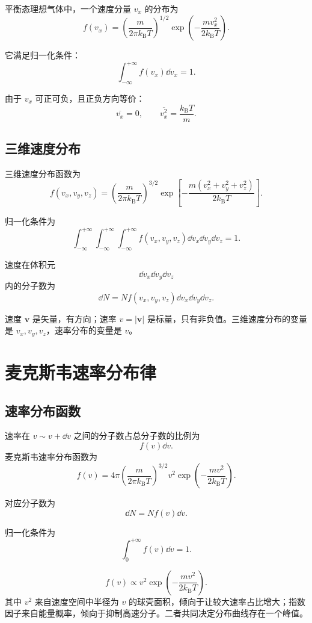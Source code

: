 平衡态理想气体中，一个速度分量 \(v_x\) 的分布为
\[
  \boxed{
  f(v_x)=
  \left(\frac{m}{2\pi k_{\mathrm B}T}\right)^{1/2}
  \exp\left(-\frac{mv_x^2}{2k_{\mathrm B}T}\right)
  }.
\]

它满足归一化条件：
\[
  \int_{-\infty}^{+\infty}f(v_x)\dd v_x=1.
\]

由于 \(v_x\) 可正可负，且正负方向等价：
\[
  \overline{v_x}=0,
  \qquad
  \overline{v_x^2}=\frac{k_{\mathrm B}T}{m}.
\]

\subsection{三维速度分布}

三维速度分布函数为
\[
  \boxed{
  f(v_x,v_y,v_z)=
  \left(\frac{m}{2\pi k_{\mathrm B}T}\right)^{3/2}
  \exp\left[
  -\frac{m(v_x^2+v_y^2+v_z^2)}{2k_{\mathrm B}T}
  \right]
  }.
\]

归一化条件为
\[
  \int_{-\infty}^{+\infty}
  \int_{-\infty}^{+\infty}
  \int_{-\infty}^{+\infty}
  f(v_x,v_y,v_z)
  \dd v_x\dd v_y\dd v_z
  =
  1.
\]

速度在体积元
\[
  \dd v_x\dd v_y\dd v_z
\]
内的分子数为
\[
  \dd N=Nf(v_x,v_y,v_z)\dd v_x\dd v_y\dd v_z.
\]

\begin{WarnBox}[速度分布与速率分布不要混]
速度 \(\bm v\) 是矢量，有方向；速率 \(v=|\bm v|\) 是标量，只有非负值。三维速度分布的变量是 \(v_x,v_y,v_z\)，速率分布的变量是 \(v\)。
\end{WarnBox}

\section{麦克斯韦速率分布律}

\subsection{速率分布函数}

速率在 \(v\sim v+\dd v\) 之间的分子数占总分子数的比例为
\[
  f(v)\dd v.
\]
麦克斯韦速率分布函数为
\[
  \boxed{
  f(v)=
  4\pi
  \left(\frac{m}{2\pi k_{\mathrm B}T}\right)^{3/2}
  v^2
  \exp\left(-\frac{mv^2}{2k_{\mathrm B}T}\right)
  }.
\]

对应分子数为
\[
  \boxed{
  \dd N=Nf(v)\dd v
  }.
\]

归一化条件为
\[
  \int_0^{+\infty}f(v)\dd v=1.
\]

\begin{KeyBox}[速率分布的两个因素]
\[
  f(v)\propto v^2\exp\left(-\frac{mv^2}{2k_{\mathrm B}T}\right).
\]
其中 \(v^2\) 来自速度空间中半径为 \(v\) 的球壳面积，倾向于让较大速率占比增大；指数因子来自能量概率，倾向于抑制高速分子。二者共同决定分布曲线存在一个峰值。
\end{KeyBox}

